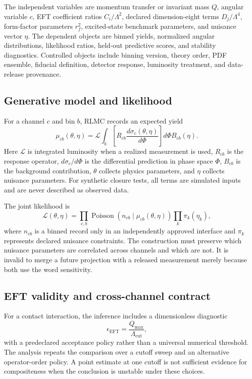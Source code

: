 The independent variables are momentum transfer or invariant mass $Q$, angular variable $c$, EFT coefficient ratios $C_i/\Lambda^2$, declared dimension-eight terms $D_j/\Lambda^4$, form-factor parameters $r_f^2$, excited-state benchmark parameters, and nuisance vector $\eta$. The dependent objects are binned yields, normalized angular distributions, likelihood ratios, held-out predictive scores, and stability diagnostics. Controlled objects include binning version, theory order, PDF ensemble, fiducial definition, detector response, luminosity treatment, and data-release provenance.

\subsection{Generative model and likelihood}

For a channel $c$ and bin $b$, RLMC records an expected yield
\begin{equation}
\mu_{cb}(\theta,\eta)=
\mathcal{L}\int_{b}\left[R_{cb}\frac{d\sigma_c(\theta,\eta)}{d\Phi}\right]d\Phi
B_{cb}(\eta).
\label{eq:yield}
\end{equation}
Here $\mathcal{L}$ is integrated luminosity when a realized measurement is used, $R_{cb}$ is the response operator, $d\sigma_c/d\Phi$ is the differential prediction in phase space $\Phi$, $B_{cb}$ is the background contribution, $\theta$ collects physics parameters, and $\eta$ collects nuisance parameters. For synthetic closure tests, all terms are simulated inputs and are never described as observed data.

The joint likelihood is
\begin{equation}
\mathcal{L}(\theta,\eta)=
\prod_{c,b}\operatorname{Poisson}\left(n_{cb}\mid\mu_{cb}(\theta,\eta)\right)
\prod_k\pi_k(\eta_k),
\label{eq:likelihood}
\end{equation}
where $n_{cb}$ is a binned record only in an independently approved interface and $\pi_k$ represents declared nuisance constraints. The construction must preserve which nuisance parameters are correlated across channels and which are not. It is invalid to merge a future projection with a released measurement merely because both use the word sensitivity.

\subsection{EFT validity and cross-channel contract}

For a contact interaction, the inference includes a dimensionless diagnostic
\begin{equation}
\epsilon_{\mathrm{EFT}}=\frac{Q_{\max}}{\Lambda_{\mathrm{cut}}},
\label{eq:eftvalidity}
\end{equation}
with a predeclared acceptance policy rather than a universal numerical threshold. The analysis repeats the comparison over a cutoff sweep and an alternative operator-order policy. A point estimate at one cutoff is not sufficient evidence for compositeness when the conclusion is unstable under these choices.

